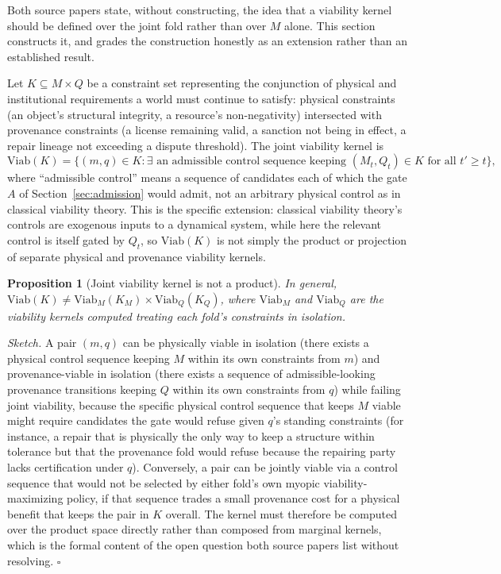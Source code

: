 \documentclass[11pt]{article}
\newtheorem{proposition}{Proposition}
\begin{document}
Both source papers state, without constructing, the idea that a viability kernel should be defined over the joint fold rather than over $M$ alone. This section constructs it, and grades the construction honestly as an extension rather than an established result.

Let $K \subseteq M \times Q$ be a constraint set representing the conjunction of physical and institutional requirements a world must continue to satisfy: physical constraints (an object's structural integrity, a resource's non-negativity) intersected with provenance constraints (a license remaining valid, a sanction not being in effect, a repair lineage not exceeding a dispute threshold). The joint viability kernel is
\[
\mathrm{Viab}(K) = \{(m,q) \in K : \exists \text{ an admissible control sequence keeping } (M_t, Q_t) \in K \text{ for all } t' \ge t\},
\]
where ``admissible control'' means a sequence of candidates each of which the gate $A$ of Section~\ref{sec:admission} would admit, not an arbitrary physical control as in classical viability theory. This is the specific extension: classical viability theory's controls are exogenous inputs to a dynamical system, while here the relevant control is itself gated by $Q_t$, so $\mathrm{Viab}(K)$ is not simply the product or projection of separate physical and provenance viability kernels.

\begin{proposition}[Joint viability kernel is not a product]
\label{prop:viability-not-product}
In general, $\mathrm{Viab}(K) \neq \mathrm{Viab}_M(K_M) \times \mathrm{Viab}_Q(K_Q)$, where $\mathrm{Viab}_M$ and $\mathrm{Viab}_Q$ are the viability kernels computed treating each fold's constraints in isolation.
\end{proposition}

\emph{Sketch.} A pair $(m,q)$ can be physically viable in isolation (there exists a physical control sequence keeping $M$ within its own constraints from $m$) and provenance-viable in isolation (there exists a sequence of admissible-looking provenance transitions keeping $Q$ within its own constraints from $q$) while failing joint viability, because the specific physical control sequence that keeps $M$ viable might require candidates the gate would refuse given $q$'s standing constraints (for instance, a repair that is physically the only way to keep a structure within tolerance but that the provenance fold would refuse because the repairing party lacks certification under $q$). Conversely, a pair can be jointly viable via a control sequence that would not be selected by either fold's own myopic viability-maximizing policy, if that sequence trades a small provenance cost for a physical benefit that keeps the pair in $K$ overall. The kernel must therefore be computed over the product space directly rather than composed from marginal kernels, which is the formal content of the open question both source papers list without resolving. $\square$
\end{document}

